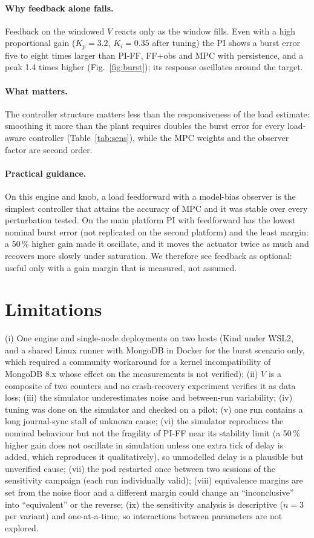 \documentclass[smallextended]{svjour3}
\begin{document}
\paragraph{Why feedback alone fails.}
Feedback on the windowed $V$ reacts only as the window fills. Even with a high proportional gain ($K_p=3.2$, $K_i=0.35$ after tuning) the PI shows a
burst error five to eight times larger than PI-FF, FF+obs and MPC with persistence, and a peak 1.4 times higher (Fig.~\ref{fig:burst}); its response oscillates around the target.
\paragraph{What matters.}
The controller structure matters less than the responsiveness of the load estimate: smoothing it more than the plant requires doubles the burst error for every load-aware controller (Table~\ref{tab:sens}), while the MPC weights and the observer factor are second order.
\paragraph{Practical guidance.}
On this engine and knob, a load feedforward with a model-bias observer is the simplest controller that attains the accuracy of MPC and it was stable over every perturbation tested. On the main platform PI with feedforward has the lowest nominal burst error (not replicated on the second platform) and the least margin: a 50\,\% higher gain made it oscillate,
and it moves the actuator twice as much and recovers more slowly under saturation. We therefore see feedback as optional: useful only with a gain margin that is measured, not assumed.

\section{Limitations}\label{sec:limits}
(i) One engine and single-node deployments on two hosts (Kind under WSL2, and a shared Linux runner with MongoDB in Docker for the burst scenario only, which required a community workaround for a kernel incompatibility of MongoDB 8.x whose effect on the measurements is not verified); (ii) $V$ is a composite of two counters and no crash-recovery experiment verifies it as data loss;
(iii) the simulator underestimates noise and between-run variability; (iv) tuning was done on the simulator and checked on a pilot; (v) one run contains a long journal-sync stall of unknown cause;
(vi) the simulator reproduces the nominal behaviour but not the fragility of PI-FF near its stability limit (a 50\,\% higher gain does not oscillate in simulation unless one extra tick of delay is added, which reproduces it qualitatively), so unmodelled delay is a plausible but unverified cause; (vii) the pod restarted once between two sessions of the sensitivity campaign (each run individually valid); (viii) equivalence margins are set from the noise floor and a different margin could change an ``inconclusive'' into ``equivalent'' or the reverse; (ix) the sensitivity analysis is descriptive ($n=3$ per variant) and one-at-a-time, so interactions between parameters are not explored.
\end{document}
